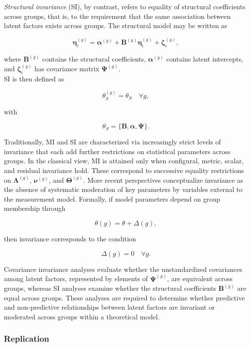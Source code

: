 \documentclass[
  12pt,
  letterpaper,
  man]{apa7}
\begin{document}
\emph{Structural invariance} (SI), by contrast, refers to equality of
structural coefficients across groups, that is, to the requirement that
the same association between latent factors exists across groups. The
structural model may be written as

\[ \boldsymbol{\eta}_i^{(g)} = \boldsymbol{\alpha}^{(g)} + \mathbf{B}^{(g)} \boldsymbol{\eta}_i^{(g)} + \boldsymbol{\zeta}_i^{(g)}, \]

where \(\mathbf{B}^{(g)}\) contains the structural coefficients,
\(\boldsymbol{\alpha}^{(g)}\) contains latent intercepts, and
\(\boldsymbol{\zeta}_i^{(g)}\) has covariance matrix
\(\boldsymbol{\Psi}^{(g)}\).\\
SI is then defined as

\[\theta_S^{(g)} = \theta_S \quad \forall g,\]

with

\[\theta_S = \{\mathbf{B}, \boldsymbol{\alpha}, \boldsymbol{\Psi}\}. \]

Traditionally, MI and SI are characterized via increasingly strict
levels of invariance that each add further restrictions on statistical
parameters across groups. In the classical view, MI is attained only
when configural, metric, scalar, and residual invariance hold. These
correspond to successive equality restrictions on
\(\boldsymbol{\Lambda}^{(g)}\), \(\boldsymbol{\nu}^{(g)}\), and
\(\boldsymbol{\Theta}^{(g)}\). More recent perspectives conceptualize
invariance as the absence of systematic moderation of key parameters by
variables external to the measurement model. Formally, if model
parameters depend on group membership through

\[ \theta(g) = \theta + \Delta(g), \]

then invariance corresponds to the condition

\[ \Delta(g) = 0 \quad \forall g. \]

Covariance invariance analyses evaluate whether the unstandardized
covariances among latent factors, represented by elements of
\(\boldsymbol{\Psi}^{(g)}\), are equivalent across groups, whereas SI
analyses examine whether the structural coefficients
\(\mathbf{B}^{(g)}\) are equal across groups. These analyses are
required to determine whether predictive and non-predictive
relationships between latent factors are invariant or moderated across
groups within a theoretical model.

\subsubsection{Replication}\label{replication}
\end{document}
